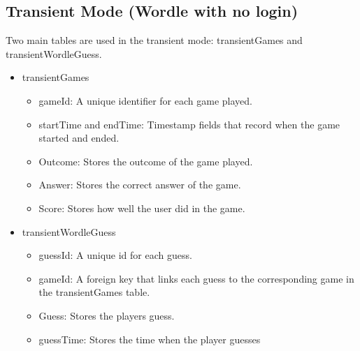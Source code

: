 \subsection{Transient Mode (Wordle with no login)}
Two main tables are used in the transient mode: transientGames and transientWordleGuess.
\begin{itemize}
    \item transientGames
        \begin{itemize}
        \item gameId: A unique identifier for each game played.
        \item startTime and endTime: Timestamp fields that record when the game started and ended.
        \item Outcome: Stores the outcome of the game played.
        \item Answer: Stores the correct answer of the game.
        \item Score: Stores how well the user did in the game.
        \end{itemize}
    \item transientWordleGuess
        \begin{itemize}
        \item guessId: A unique id for each guess.
        \item gameId: A foreign key that links each guess to the corresponding game in the transientGames table.
        \item Guess: Stores the players guess.
        \item guessTime: Stores the time when the player guesses
        \end{itemize}
    \end{itemize}
    
